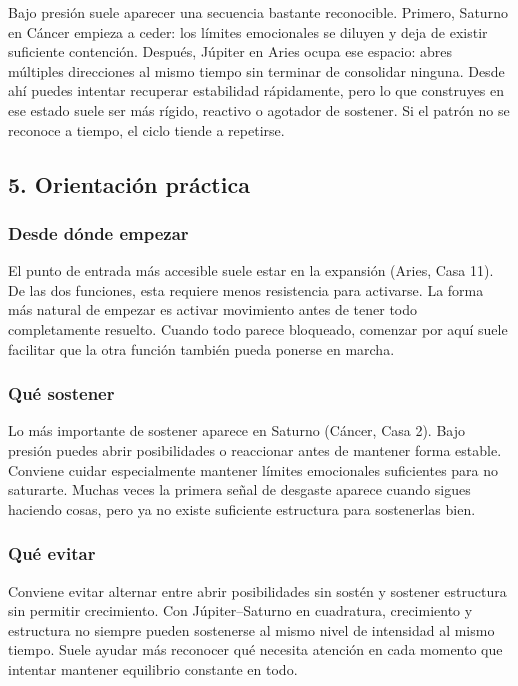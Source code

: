\documentclass[11pt,a4paper]{article}
\begin{document}
Bajo presión suele aparecer una secuencia bastante reconocible. Primero, Saturno en Cáncer empieza a ceder: los límites emocionales se diluyen y deja de existir suficiente contención. Después, Júpiter en Aries ocupa ese espacio: abres múltiples direcciones al mismo tiempo sin terminar de consolidar ninguna. Desde ahí puedes intentar recuperar estabilidad rápidamente, pero lo que construyes en ese estado suele ser más rígido, reactivo o agotador de sostener. Si el patrón no se reconoce a tiempo, el ciclo tiende a repetirse.

\vspace{0.8cm}


\subsection{5. Orientación práctica}

\subsubsection*{Desde dónde empezar}

El punto de entrada más accesible suele estar en la expansión (Aries, Casa 11). De las dos funciones, esta requiere menos resistencia para activarse. La forma más natural de empezar es activar movimiento antes de tener todo completamente resuelto. Cuando todo parece bloqueado, comenzar por aquí suele facilitar que la otra función también pueda ponerse en marcha.

\subsubsection*{Qué sostener}

Lo más importante de sostener aparece en Saturno (Cáncer, Casa 2). Bajo presión puedes abrir posibilidades o reaccionar antes de mantener forma estable. Conviene cuidar especialmente mantener límites emocionales suficientes para no saturarte. Muchas veces la primera señal de desgaste aparece cuando sigues haciendo cosas, pero ya no existe suficiente estructura para sostenerlas bien.

\subsubsection*{Qué evitar}

Conviene evitar alternar entre abrir posibilidades sin sostén y sostener estructura sin permitir crecimiento. Con Júpiter–Saturno en cuadratura, crecimiento y estructura no siempre pueden sostenerse al mismo nivel de intensidad al mismo tiempo. Suele ayudar más reconocer qué necesita atención en cada momento que intentar mantener equilibrio constante en todo.
\end{document}

